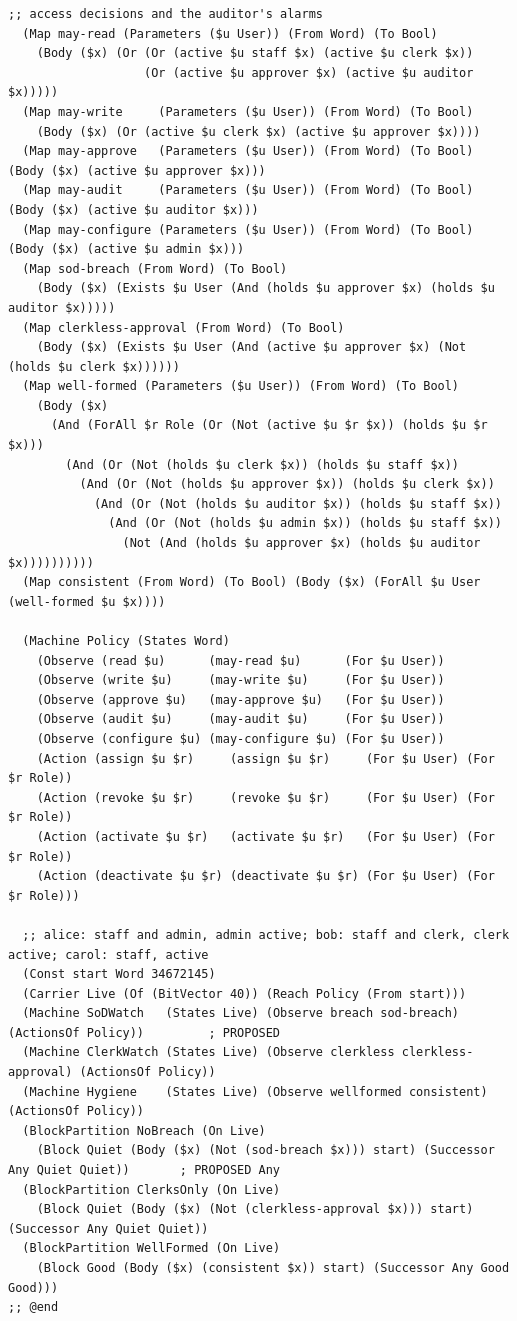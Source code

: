 \documentclass[11pt]{article}
\theoremstyle{definition}
\theoremstyle{plain}
\begin{document}
\begin{lstlisting}[style=mettafull]
  ;; access decisions and the auditor's alarms
  (Map may-read (Parameters ($u User)) (From Word) (To Bool)
    (Body ($x) (Or (Or (active $u staff $x) (active $u clerk $x))
                   (Or (active $u approver $x) (active $u auditor $x)))))
  (Map may-write     (Parameters ($u User)) (From Word) (To Bool)
    (Body ($x) (Or (active $u clerk $x) (active $u approver $x))))
  (Map may-approve   (Parameters ($u User)) (From Word) (To Bool) (Body ($x) (active $u approver $x)))
  (Map may-audit     (Parameters ($u User)) (From Word) (To Bool) (Body ($x) (active $u auditor $x)))
  (Map may-configure (Parameters ($u User)) (From Word) (To Bool) (Body ($x) (active $u admin $x)))
  (Map sod-breach (From Word) (To Bool)
    (Body ($x) (Exists $u User (And (holds $u approver $x) (holds $u auditor $x)))))
  (Map clerkless-approval (From Word) (To Bool)
    (Body ($x) (Exists $u User (And (active $u approver $x) (Not (holds $u clerk $x))))))
  (Map well-formed (Parameters ($u User)) (From Word) (To Bool)
    (Body ($x)
      (And (ForAll $r Role (Or (Not (active $u $r $x)) (holds $u $r $x)))
        (And (Or (Not (holds $u clerk $x)) (holds $u staff $x))
          (And (Or (Not (holds $u approver $x)) (holds $u clerk $x))
            (And (Or (Not (holds $u auditor $x)) (holds $u staff $x))
              (And (Or (Not (holds $u admin $x)) (holds $u staff $x))
                (Not (And (holds $u approver $x) (holds $u auditor $x))))))))))
  (Map consistent (From Word) (To Bool) (Body ($x) (ForAll $u User (well-formed $u $x))))

  (Machine Policy (States Word)
    (Observe (read $u)      (may-read $u)      (For $u User))
    (Observe (write $u)     (may-write $u)     (For $u User))
    (Observe (approve $u)   (may-approve $u)   (For $u User))
    (Observe (audit $u)     (may-audit $u)     (For $u User))
    (Observe (configure $u) (may-configure $u) (For $u User))
    (Action (assign $u $r)     (assign $u $r)     (For $u User) (For $r Role))
    (Action (revoke $u $r)     (revoke $u $r)     (For $u User) (For $r Role))
    (Action (activate $u $r)   (activate $u $r)   (For $u User) (For $r Role))
    (Action (deactivate $u $r) (deactivate $u $r) (For $u User) (For $r Role)))

  ;; alice: staff and admin, admin active; bob: staff and clerk, clerk active; carol: staff, active
  (Const start Word 34672145)
  (Carrier Live (Of (BitVector 40)) (Reach Policy (From start)))
  (Machine SoDWatch   (States Live) (Observe breach sod-breach) (ActionsOf Policy))         ; PROPOSED
  (Machine ClerkWatch (States Live) (Observe clerkless clerkless-approval) (ActionsOf Policy))
  (Machine Hygiene    (States Live) (Observe wellformed consistent) (ActionsOf Policy))
  (BlockPartition NoBreach (On Live)
    (Block Quiet (Body ($x) (Not (sod-breach $x))) start) (Successor Any Quiet Quiet))       ; PROPOSED Any
  (BlockPartition ClerksOnly (On Live)
    (Block Quiet (Body ($x) (Not (clerkless-approval $x))) start) (Successor Any Quiet Quiet))
  (BlockPartition WellFormed (On Live)
    (Block Good (Body ($x) (consistent $x)) start) (Successor Any Good Good)))
;; @end


\end{lstlisting}
\end{document}
